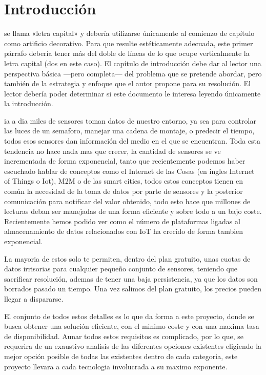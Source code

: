 \chapter{Introducción}

 se llama «letra capital» y debería utilizarse únicamente al
comienzo de capítulo como artificio decorativo. Para que resulte estéticamente
adecuada, este primer párrafo debería tener más del doble de líneas de lo que
ocupe verticalmente la letra capital (dos en este caso). El capítulo de
introducción debe dar al lector una perspectiva básica ---pero completa--- del
problema que se pretende abordar, pero también de la estrategia y enfoque que el
autor propone para su resolución. El lector debería poder determinar si este
documento le interesa leyendo únicamente la introducción.


ia a dia miles de sensores toman datos de nuestro entorno, ya sea para controlar las luces de un semaforo, manejar una cadena de montaje, o predecir el
tiempo, todos esos sensores dan información del medio en el que se
encuentran. Toda esta tendencia no hace nada mas que crecer, la cantidad de sensores se ve incrementada de forma
exponencial, tanto que recientemente podemos haber escuchado hablar de conceptos
como el Internet de las Cosas (en ingles Internet of Things o Iot), M2M o de las
smart cities, todos estos conceptos tienen en común la necesidad de la toma de
datos por parte de sensores y la posterior comunicación para notificar del valor
obtenido, todo esto hace que millones de lecturas deban ser manejadas de una
forma eficiente y sobre todo a un bajo coste. Recientemente hemos podido ver
como el número de plataformas ligadas al almacenamiento de datos relacionados con IoT ha crecido de forma tambien exponencial.

La mayoria de estos solo te permiten, dentro del plan gratuito, unas cuotas de
datos irrisorias para cualquier pequeño conjunto de sensores, teniendo que
sacrificar resolución, ademas de tener una baja persistencia, ya que los datos son borrados pasado un tiempo. Una vez salimos del plan gratuito, los precios pueden llegar a dispararse.

El conjunto de todos estos detalles es lo que da forma a este proyecto, donde se
busca obtener una solución eficiente, con el minimo coste y con una maxima tasa
de disponibilidad. Aunar todos estos requisitos es
complicado, por lo que, se requerira de un exaustivo analisis de las diferentes
opciones existentes eligiendo la mejor opción posible de todas las existentes
dentro de cada categoria, este proyecto llevara a cada tecnologia involucrada a
su maximo exponente.

